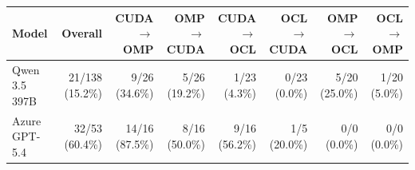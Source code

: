 \begin{tabular}{lrrrrrrr}
\toprule
Model & Overall & CUDA$\to$OMP & OMP$\to$CUDA & CUDA$\to$OCL & OCL$\to$CUDA & OMP$\to$OCL & OCL$\to$OMP \\
\midrule
Qwen 3.5 397B & 21/138 (15.2\%) & 9/26 (34.6\%) & 5/26 (19.2\%) & 1/23 (4.3\%) & 0/23 (0.0\%) & 5/20 (25.0\%) & 1/20 (5.0\%) \\
Azure GPT-5.4 & 32/53 (60.4\%) & 14/16 (87.5\%) & 8/16 (50.0\%) & 9/16 (56.2\%) & 1/5 (20.0\%) & 0/0 (0.0\%) & 0/0 (0.0\%) \\
\bottomrule
\end{tabular}
